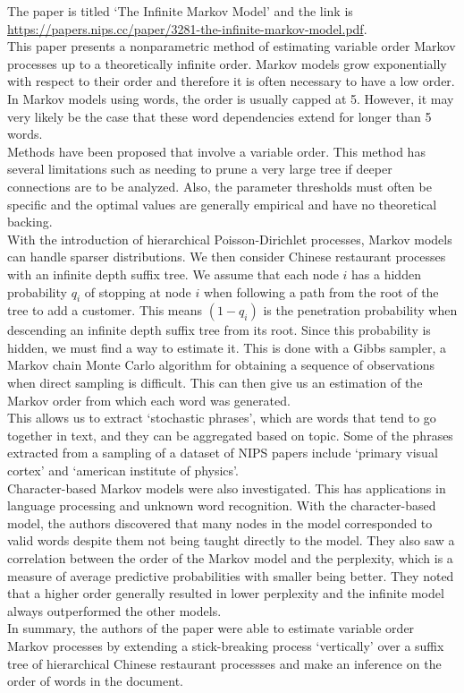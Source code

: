 \documentclass[11pt,letterpaper,boxed]{hmcpset}
\begin{document}

The paper is titled `The Infinite Markov Model' and the link is
\url{https://papers.nips.cc/paper/3281-the-infinite-markov-model.pdf}.\\

This paper presents a nonparametric method of estimating variable order Markov
processes up to a theoretically infinite order. Markov models grow
exponentially with respect to their order and therefore it is often necessary
to have a low order. In Markov models using words, the order is usually capped
at 5. However, it may very likely be the case that these word dependencies
extend for longer than 5 words.\\

Methods have been proposed that involve a variable order. This method has
several limitations such as needing to prune a very large tree if deeper
connections are to be analyzed. Also, the parameter thresholds must often be
specific and the optimal values are generally empirical and have no theoretical
backing.\\

With the introduction of hierarchical Poisson-Dirichlet processes, Markov
models can handle sparser distributions. We then consider Chinese restaurant
processes with an infinite depth suffix tree. We assume that each node $i$ has
a hidden probability $q_i$ of stopping at node $i$ when following a path from
the root of the tree to add a customer. This means $(1-q_i)$ is the penetration
probability when descending an infinite depth suffix tree from its root. Since
this probability is hidden, we must find a way to estimate it. This is done
with a Gibbs sampler, a Markov chain Monte Carlo algorithm for obtaining a
sequence of observations when direct sampling is difficult. This can then give
us an estimation of the Markov order from which each word was generated.\\

This allows us to extract `stochastic phrases', which are words that tend to go
together in text, and they can be aggregated based on topic. Some of the
phrases extracted from a sampling of a dataset of NIPS papers include `primary
visual cortex' and `american institute of physics'.\\

Character-based Markov models were also investigated. This has applications in
language processing and unknown word recognition. With the character-based
model, the authors discovered that many nodes in the model corresponded to
valid words despite them not being taught directly to the model. They also saw
a correlation between the order of the Markov model and the perplexity, which
is a measure of average predictive probabilities with smaller being better.
They noted that a higher order generally resulted in lower perplexity and the
infinite model always outperformed the other models.\\

In summary, the authors of the paper were able to estimate variable order
Markov processes by extending a stick-breaking process `vertically' over a
suffix tree of hierarchical Chinese restaurant processses and make an inference
on the order of words in the document.\\
\end{document}
